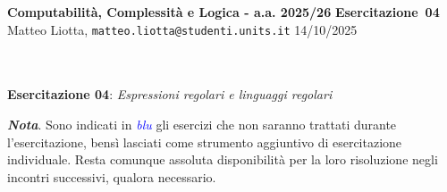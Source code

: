 \documentclass[a4paper,10pt]{article}
\makeatletter
\newcommand{\EsercitazioneNum}{04}
\newcommand{\Data}{14/10/2025}
\newcommand{\DocType}{Esercitazione} %
\newcommand{\FullTitle}{\DocType\ \EsercitazioneNum}
\newcommand{\Header}{
\noindent
  \small \textbf{Computabilità, Complessità e Logica - a.a. 2025/26} \hfill \textbf{\FullTitle} \\[0.2cm]
  \scriptsize Matteo Liotta, \texttt{matteo.liotta@studenti.units.it} \hfill \Data \\[0.2cm]
  \noindent\makebox[\linewidth]{\rule{\linewidth}{0.4pt}} \\[0.3cm]}
\makeatother
\begin{document}
\footnotesize  %
\Header\\[0.7cm]



\noindent\Large \textbf{Esercitazione 04}: \textit{Espressioni regolari e linguaggi regolari}
\begin{osservazioni}
    \textbf{\textit{Nota}}. Sono indicati in \textcolor{blue}{\textit{blu}} gli esercizi che non saranno trattati durante l'esercitazione, bensì lasciati come strumento aggiuntivo di esercitazione individuale. Resta comunque assoluta disponibilità per la loro risoluzione negli incontri successivi, qualora necessario.
\end{osservazioni}
\end{document}
